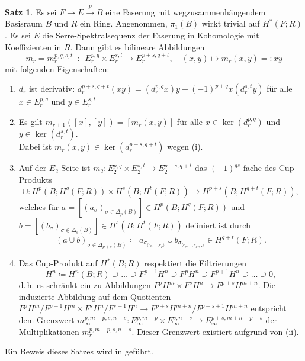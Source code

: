 \documentclass[11pt, a4paper, german]{article}
\theoremstyle{definition}
\newtheorem{satz}[lem]{Satz}
\theoremstyle{remark}
\newcommand{\angles}[1]{{\langle #1 \rangle}}
\renewcommand{\dh}{d.\,h.} %
\begin{document}
\begin{satz}\label{sss-cup-product}
  Es sei $F \to E \xrightarrow{p} B$ eine Faserung mit wegzusammenhängendem Basisraum $B$ und $R$ ein Ring.
  Angenommen, $\pi_1(B)$ wirkt trivial auf $H^*(F; R)$.
  Es sei $E$ die Serre-Spektralsequenz der Faserung in Kohomologie mit Koeffizienten in $R$.
  Dann gibt es bilineare Abbildungen
  \[
    m_r = m_r^{p,q,s,t} \enspace:\enspace E^{p,q}_r \times E^{s,t}_r \to E^{p+s,q+t}_r, \quad
    (x, y) \mapsto m_r(x, y) =: xy
  \]
  mit folgenden Eigenschaften:
  \begin{enumerate}[label=(\roman*)]
    \item $d_r$ ist derivativ: $d_r^{p+s,q+t}(xy) = (d_r^{p,q} x) y + (-1)^{p+q} x (d_r^{s,t} y)$ für alle $x \in E^{p,q}_r$ und $y \in E^{s,t}_r$
    \item Es gilt $m_{r+1}([x], [y]) = [m_r(x, y)]$ für alle $x \in \ker(d_r^{p,q})$ und $y \in \ker(d_r^{s,t})$. \\
    Dabei ist $m_r(x, y) \in \ker(d_r^{p+s,q+t})$ wegen (i).
    \item Auf der $E_2$-Seite ist $m_2 : E_2^{p,q} \!\times\! E_2^{s,t} \!\to\! E_2^{p+s,q+t}$ das $(-1)^{qs}$-fache des Cup-Produkts
    \[
      \cup : H^p(B; H^q(F; R)) \times H^s(B; H^t(F; R)) \to H^{p+s}(B; H^{q+t}(F; R)),
    \]
    welches für $a = [(a_\sigma)_{\sigma \in \Delta_p(B)}] \in H^p(B; H^q(F; R))$ und $b = [(b_\sigma)_{\sigma \in \Delta_s(B)}] \in H^s(B; H^t(F; R))$ definiert ist durch
    \[
      (a \cup b)_{\sigma \in \Delta_{p+s}(B)} \coloneqq
      a_{\sigma_{\angles{e_0, \ldots, e_p}}} \cup b_{\sigma_{\angles{e_p, \ldots, e_{p+s}}}} \in H^{q+t}(F; R).
    \]
    \item Das Cup-Produkt auf $H^*(B; R)$ respektiert die Filtrierungen
    \[ H^n \coloneqq H^n(B; R) \supseteq \ldots \supseteq F^{p-1} H^n \supseteq F^p H^n \supseteq F^{p+1} H^n \supseteq \ldots \supseteq 0, \]
    \dh{} es schränkt ein zu Abbildungen $F^p H^m \times F^s H^n \to F^{p+s} H^{m+n}$.
    Die induzierte Abbildung auf dem Quotienten $F^p H^m/F^{p+1} H^m \times F^s H^n/F^{s+1} H^n \to F^{p+s} H^{m+n} / F^{p+s+1} H^{m+n}$ entspricht dem Grenzwert $m_\infty^{p,m-p,s,n-s} : E_\infty^{p,m-p} \times E_\infty^{s,n-s} \to E_\infty^{p+s,m+n-p-s}$ der Multiplikationen $m_r^{p,m-p,s,n-s}$.
    Dieser Grenzwert existiert aufgrund von (ii).
  \end{enumerate}
\end{satz}

Ein Beweis dieses Satzes wird in \cite[Abschnitt 5.3]{mccleary:ss} geführt.
\end{document}
